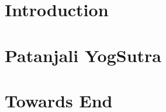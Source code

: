 \section[Intro]{Introduction}


\section[Patanjali]{Patanjali YogSutra}






\section[End]{Towards End}

